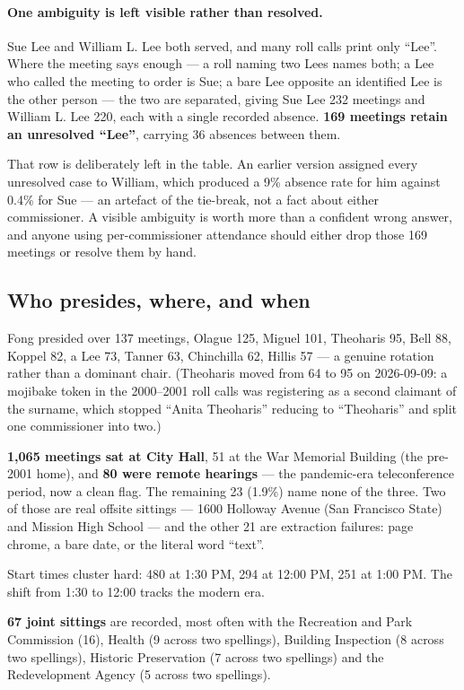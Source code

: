 \documentclass[11pt]{article}
\begin{document}
\paragraph{One ambiguity is left visible rather than resolved.} Sue Lee and William L. Lee
both served, and many roll calls print only ``Lee''. Where the meeting says enough --- a
roll naming two Lees names both; a Lee who called the meeting to order is Sue; a bare Lee
opposite an identified Lee is the other person --- the two are separated, giving Sue Lee 232
meetings and William L. Lee 220, each with a single recorded absence. \textbf{169 meetings
retain an unresolved ``Lee''}, carrying 36 absences between them.

That row is deliberately left in the table. An earlier version assigned every unresolved
case to William, which produced a 9\% absence rate for him against 0.4\% for Sue --- an
artefact of the tie-break, not a fact about either commissioner. A visible ambiguity is
worth more than a confident wrong answer, and anyone using per-commissioner attendance
should either drop those 169 meetings or resolve them by hand.

\subsection{Who presides, where, and when}

Fong presided over 137 meetings, Olague 125, Miguel 101, Theoharis 95, Bell 88,
Koppel 82, a Lee 73, Tanner 63, Chinchilla 62, Hillis 57 --- a genuine rotation rather than
a dominant chair. (Theoharis moved from 64 to 95 on 2026-09-09: a mojibake token in the
2000--2001 roll calls was registering as a second claimant of the surname, which stopped
``Anita Theoharis'' reducing to ``Theoharis'' and split one commissioner into two.)

\textbf{1{,}065 meetings sat at City Hall}, 51 at the War Memorial Building (the pre-2001
home), and \textbf{80 were remote hearings} --- the pandemic-era teleconference period, now
a clean flag. The remaining 23 (1.9\%) name none of the three. Two of those are real offsite
sittings --- 1600 Holloway Avenue (San Francisco State) and Mission High School --- and the
other 21 are extraction failures: page chrome, a bare date, or the literal word ``text''.

Start times cluster hard: 480 at 1:30 PM, 294 at 12:00 PM, 251 at 1:00 PM. The shift from
1:30 to 12:00 tracks the modern era.

\textbf{67 joint sittings} are recorded, most often with the Recreation and Park Commission
(16), Health (9 across two spellings), Building Inspection (8 across two spellings), Historic
Preservation (7 across two spellings) and the Redevelopment Agency (5 across two spellings).
\end{document}
